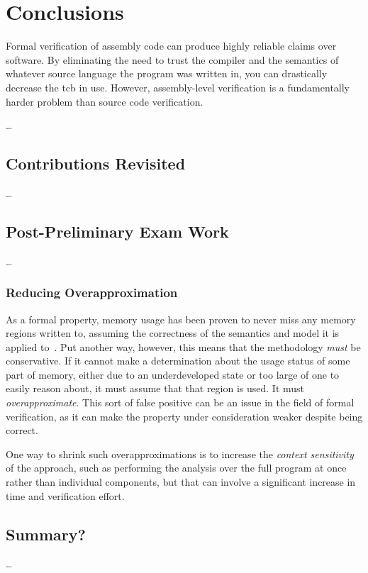 \chapter{Conclusions}\label{ch:conclusions}
Formal verification of assembly code can produce highly reliable claims over software.
By eliminating the need to trust the compiler
and the semantics of whatever source language the program was written in,
you can drastically decrease the \ac{tcb} in use.
However, assembly-level verification is a fundamentally harder problem
than source code verification.

\todo\dots

\section{Contributions Revisited}
\todo\dots
\section{Post-Preliminary Exam Work}
\todo\dots

\subsection{Reducing Overapproximation}\label{mem_use_over}
As a formal property, memory usage has been proven to never miss any memory regions
written to, assuming the correctness of the semantics and model it is applied
to~\citep{bockenek2019preservation,popl2019underreview}.
Put another way, however,
this means that the methodology \emph{must} be conservative.
If it cannot make a determination about the usage status of some part of memory,
either due to an underdeveloped state or too large of one to easily reason about,
it must assume that that region is used. It must \emph{overapproximate}.%
This sort of false positive can be an issue in the field of formal verification,
as it can make the property under consideration weaker despite being correct.

One way to shrink such overapproximations is to increase the
\emph{context sensitivity}
of the approach, such as performing the analysis over the full program at once
rather than individual components, but that can involve
a significant increase in time and verification effort.


\section{Summary?}
\todo\dots
